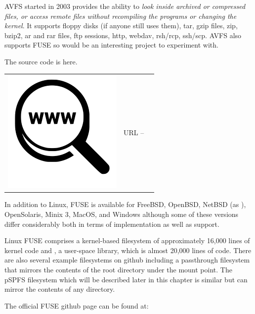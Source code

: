 AVFS started in 2003 provides the ability to \textit{look inside archived or compressed files, or access remote files without recompiling the programs or changing the kernel}. It supports floppy disks (if anyone still uses them), tar, gzip files, zip, bzip2, ar and rar files, ftp sessions, http, webdav, rsh/rcp, ssh/scp. AVFS also supports FUSE so would be an interesting project to experiment with.

The source code is here.

\begin{table}[h]
\begin{tabular}{lcl}
\parbox[r]{0.5in}{\includegraphics[scale=0.15]{figures/url.png}} & \parbox[l]{0.55in}{URL  -- } & \parbox[l]{3in}{}
\end{tabular}
\end{table}

\noindent
In addition to Linux, FUSE is available for FreeBSD, OpenBSD, NetBSD (as ), OpenSolaris, Minix 3, MacOS, and Windows although some of these versions differ considerably both in terms of implementation as well as support. 

Linux FUSE comprises a kernel-based filesystem of approximately 16,000 lines of kernel code and , a user-space library, which is almost 20,000 lines of code.  There are also several example filesystems on github including a passthrough filesystem that mirrors the contents of the root directory under the mount point. The pSPFS filesystem which will be described later in this chapter is similar but can mirror the contents of any directory.

The official FUSE github page can be found at:

